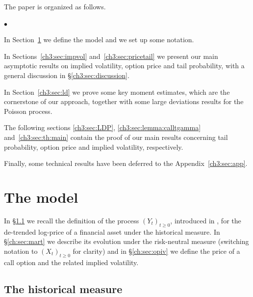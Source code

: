 \documentclass[a4paper,reqno,11pt]{amsart}
\numberwithin{equation}{section}
\newenvironment{myitemize}{%
\begin{list}{$\bullet$}%
 	{%
	\setlength{\itemsep}{0.4em}%
	\setlength{\topsep}{0.5em}%
	\setlength\leftmargin{2.45em}%
	\setlength\labelwidth{2.05em}%
	\setlength{\labelsep}{0.4em}%
	}%
	}%
{\end{list}}
\renewenvironment{itemize}{
\begin{myitemize}}%
{\end{myitemize}}
\begin{document}
\smallskip

The paper is organized as follows.
\begin{itemize}
\item In Section~\ref{ch3:sec:model} we define the model and we set up some notation.

\item In Sections~\ref{ch3:sec:impvol} and~\ref{ch3:sec:pricetail} 
we present our main asymptotic results on implied volatility, option price and tail probability,
with a general discussion in \S\ref{ch3:sec:discussion}.

\item In Section~\ref{ch3:sec:ld} we prove some key moment estimates,
which are the cornerstone of our approach, together with some large deviations results
for the Poisson process.

\item The following sections \ref{ch3:sec:LDP}, \ref{ch3:sec:lemma:calltgamma} 
and~\ref{ch3:sec:th:main} contain the proof of our main results concerning
tail probability, option price and implied volatility, respectively.

\item Finally, some technical results have been deferred to the Appendix~\ref{ch3:sec:app}.
\end{itemize}

\section{The model}
\label{ch3:sec:model}

In \S\ref{ch3:sec:hist} we recall the definition of the process $(Y_t)_{t\ge 0}$, introduced
in \cite{cf:ACDP}, for the de-trended log-price of a financial asset
under the historical measure. In \S\ref{ch:sec:mart} we describe its evolution under 
the risk-neutral measure (switching notation to $(X_t)_{t\ge 0}$ for clarity)
and in \S\ref{ch:sec:opiv} we define the price of a call option and the related implied volatility.


\subsection{The historical measure}
\label{ch3:sec:hist}
\end{document}
